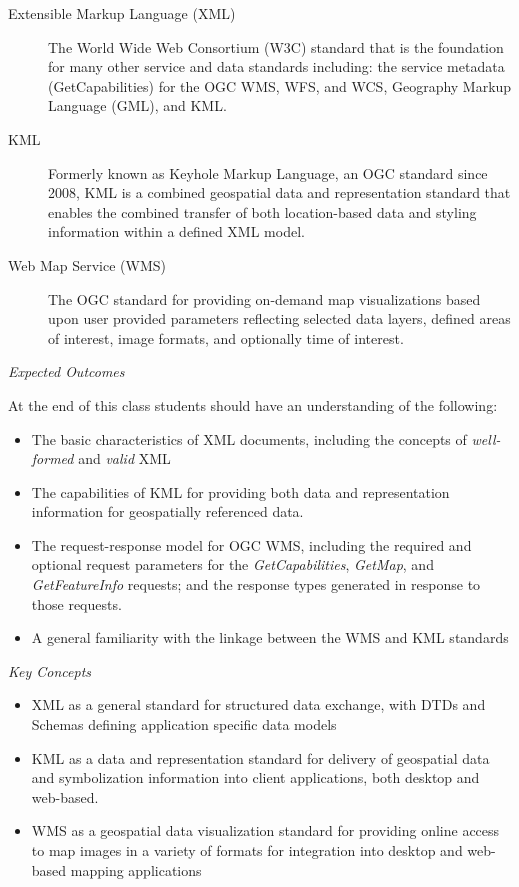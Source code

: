 \documentclass[]{book}
\begin{document}
\begin{description}
\item[Extensible Markup Language (XML)]
The World Wide Web Consortium (W3C) standard that is the foundation for
many other service and data standards including: the service metadata
(GetCapabilities) for the OGC WMS, WFS, and WCS, Geography Markup
Language (GML), and KML.
\item[KML]
Formerly known as Keyhole Markup Language, an OGC standard since 2008,
KML is a combined geospatial data and representation standard that
enables the combined transfer of both location-based data and styling
information within a defined XML model.
\item[Web Map Service (WMS)]
The OGC standard for providing on-demand map visualizations based upon
user provided parameters reflecting selected data layers, defined areas
of interest, image formats, and optionally time of interest.
\end{description}

\emph{Expected Outcomes}

At the end of this class students should have an understanding of the
following:

\begin{itemize}
\item
  The basic characteristics of XML documents, including the concepts of
  \emph{well-formed} and \emph{valid} XML
\item
  The capabilities of KML for providing both data and representation
  information for geospatially referenced data.
\item
  The request-response model for OGC WMS, including the required and
  optional request parameters for the \emph{GetCapabilities},
  \emph{GetMap}, and \emph{GetFeatureInfo} requests; and the response
  types generated in response to those requests.
\item
  A general familiarity with the linkage between the WMS and KML
  standards
\end{itemize}

\emph{Key Concepts}

\begin{itemize}
\item
  XML as a general standard for structured data exchange, with DTDs and
  Schemas defining application specific data models
\item
  KML as a data and representation standard for delivery of geospatial
  data and symbolization information into client applications, both
  desktop and web-based.
\item
  WMS as a geospatial data visualization standard for providing online
  access to map images in a variety of formats for integration into
  desktop and web-based mapping applications
\end{itemize}
\end{document}
